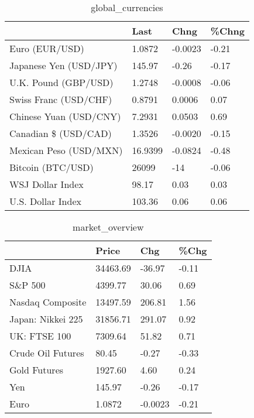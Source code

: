 \documentclass{article}%
\begin{document}
%


\begin{table}[htbp]%
\caption{global\_currencies}%
\centering%
\begin{adjustbox}{width=1\textwidth}%
\begin{tabular}{llll}
\toprule
                       &    Last &    Chng & \%Chng \\
\midrule
        Euro (EUR/USD) &  1.0872 & -0.0023 & -0.21 \\
Japanese Yen (USD/JPY) &  145.97 &   -0.26 & -0.17 \\
  U.K. Pound (GBP/USD) &  1.2748 & -0.0008 & -0.06 \\
 Swiss Franc (USD/CHF) &  0.8791 &  0.0006 &  0.07 \\
Chinese Yuan (USD/CNY) &  7.2931 &  0.0503 &  0.69 \\
  Canadian \$ (USD/CAD) &  1.3526 & -0.0020 & -0.15 \\
Mexican Peso (USD/MXN) & 16.9399 & -0.0824 & -0.48 \\
     Bitcoin (BTC/USD) &   26099 &     -14 & -0.06 \\
      WSJ Dollar Index &   98.17 &    0.03 &  0.03 \\
     U.S. Dollar Index &  103.36 &    0.06 &  0.06 \\
\bottomrule
\end{tabular}
%
\end{adjustbox}%
\end{table}

%


\begin{table}[htbp]%
\caption{market\_overview}%
\centering%
\begin{adjustbox}{width=1\textwidth}%
\begin{tabular}{llll}
\toprule
                  &    Price &     Chg &  \%Chg \\
\midrule
             DJIA & 34463.69 &  -36.97 & -0.11 \\
          S\&P 500 &  4399.77 &   30.06 &  0.69 \\
 Nasdaq Composite & 13497.59 &  206.81 &  1.56 \\
Japan: Nikkei 225 & 31856.71 &  291.07 &  0.92 \\
     UK: FTSE 100 &  7309.64 &   51.82 &  0.71 \\
Crude Oil Futures &    80.45 &   -0.27 & -0.33 \\
     Gold Futures &  1927.60 &    4.60 &  0.24 \\
              Yen &   145.97 &   -0.26 & -0.17 \\
             Euro &   1.0872 & -0.0023 & -0.21 \\
\bottomrule
\end{tabular}
%
\end{adjustbox}%
\end{table}

%
\end{document}
